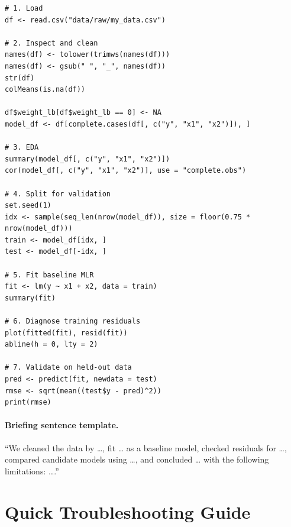 \begin{verbatim}
# 1. Load
df <- read.csv("data/raw/my_data.csv")

# 2. Inspect and clean
names(df) <- tolower(trimws(names(df)))
names(df) <- gsub(" ", "_", names(df))
str(df)
colMeans(is.na(df))

df$weight_lb[df$weight_lb == 0] <- NA
model_df <- df[complete.cases(df[, c("y", "x1", "x2")]), ]

# 3. EDA
summary(model_df[, c("y", "x1", "x2")])
cor(model_df[, c("y", "x1", "x2")], use = "complete.obs")

# 4. Split for validation
set.seed(1)
idx <- sample(seq_len(nrow(model_df)), size = floor(0.75 * nrow(model_df)))
train <- model_df[idx, ]
test <- model_df[-idx, ]

# 5. Fit baseline MLR
fit <- lm(y ~ x1 + x2, data = train)
summary(fit)

# 6. Diagnose training residuals
plot(fitted(fit), resid(fit))
abline(h = 0, lty = 2)

# 7. Validate on held-out data
pred <- predict(fit, newdata = test)
rmse <- sqrt(mean((test$y - pred)^2))
print(rmse)
\end{verbatim}

\paragraph{Briefing sentence template.} ``We cleaned the data by \ldots{}, fit \ldots{} as a baseline model, checked residuals for \ldots{}, compared candidate models using \ldots{}, and concluded \ldots{} with the following limitations: \ldots{}.''

\section{Quick Troubleshooting Guide}
\label{app:cookbook-troubleshooting-guide}

